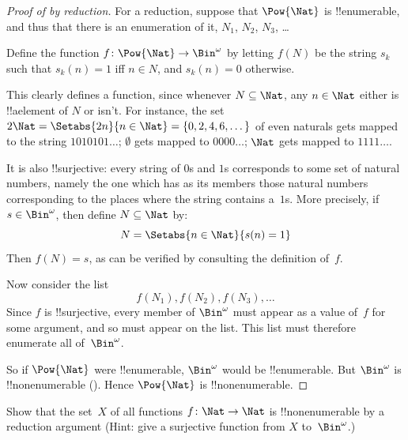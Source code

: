 \begin{proof}[Proof of {} by reduction]
For a reduction, suppose that $\Pow{\Nat}$ is !!{enumerable}, and thus that
there is an enumeration of it, $N_{1}$, $N_{2}$, $N_{3}$, \dots

Define the function $f \colon \Pow{\Nat} \to \Bin^\omega$ by letting
$f(N)$ be the string $s_{k}$ such that $s_{k}(n) = 1$ iff $n \in N$,
and $s_k(n) = 0$ otherwise.  

This clearly defines a function, since whenever $N \subseteq \Nat$,
any $n \in \Nat$ either is !!a{element} of $N$ or isn't.  For
instance, the set $2\Nat = \Setabs{2n}{n \in \Nat} = \{0,2, 4, 6,
\dots\}$ of even naturals gets mapped to the string $1010101\dots$;
$\emptyset$ gets mapped to $0000\dots$; $\Nat$ gets mapped to
$1111\dots$.

It is also !!{surjective}: every string of $0$s and $1$s corresponds
to some set of natural numbers, namely the one which has as its
members those natural numbers corresponding to the places where the string
contains a~$1$s. More precisely, if $s \in \Bin^\omega$, then define $N
\subseteq \Nat$ by:
\[
N = \Setabs{n \in \Nat}{s(n) = 1}
\]
Then $f(N) = s$, as can be verified by consulting the definition
of~$f$. 

Now consider the list
\[
f(N_1), f(N_2), f(N_3), \dots
\]
Since $f$ is !!{surjective}, every member of $\Bin^\omega$ must
appear as a value of~$f$ for some argument, and so must appear on the
list. This list must therefore enumerate all of~$\Bin^\omega$.

So if $\Pow{\Nat}$ were !!{enumerable}, $\Bin^\omega$ would be
!!{enumerable}.  But $\Bin^\omega$ is !!{nonenumerable}
(). Hence $\Pow{\Nat}$ is
!!{nonenumerable}.
\end{proof}



















\begin{prob}\label{sfr:siz:red-alt:prob:nat-nat}
  Show that the set~$X$ of all functions $f\colon \Nat \to \Nat$ is
  !!{nonenumerable} by a reduction argument (Hint: give a surjective
  function from $X$ to~$\Bin^\omega$.)
\end{prob}

